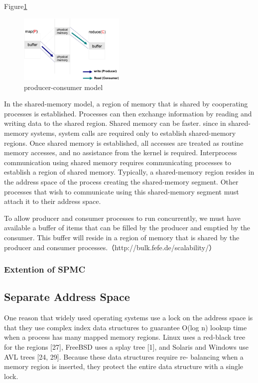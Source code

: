 Figure\ref{fig:dmr:spmc}
\begin{figure}[!h!t]
    \centering
    \includegraphics[width=0.45\textwidth]{eps/dmr_pc_model.eps}
    \caption{producer-consumer model}
    \label{fig:dmr:spmc}
\end{figure}
{\color{gray}
In the shared-memory model, a region of memory that is shared
by cooperating processes is established. 
Processes can then exchange information 
by reading and writing data to the shared region.
Shared memory can be faster.
since in shared-memory systems, system calls are required only to establish shared-memory regions. 
Once shared memory is established, all accesses are treated
as routine memory accesses, and no assistance from the kernel is required.
}
Interprocess communication using shared memory requires communicating
processes to establish a region of shared memory. Typically, a shared-memory
region resides in the address space of the process creating the shared-memory
segment. Other processes that wish to communicate using this shared-memory
segment must attach it to their address space. 

To allow producer and consumer processes to run concurrently, we must have
available a buffer of items that can be filled by the producer and emptied by
the consumer. This buffer will reside in a region of memory that is shared by
the producer and consumer processes.（http://bulk.fefe.de/scalability/）

\subsubsection{Extention of SPMC}





\subsection{Separate Address Space}

One reason that widely used operating systems use a lock on the address space is that 
they use complex index data structures to guarantee O(log n)
lookup time when a process has many mapped memory
regions. Linux uses a red-black tree for the regions [27],
FreeBSD uses a splay tree [1], and Solaris and Windows use
AVL trees [24, 29]. 
Because these data structures require re-
balancing when a memory region is inserted, they protect the
entire data structure with a single lock.


